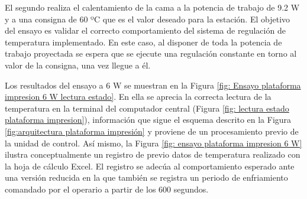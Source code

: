 El segundo realiza el calentamiento de la cama a la potencia de trabajo de 9.2 W y a una consigna de 60 ºC que es el valor deseado para la estación. El objetivo del ensayo es validar el correcto comportamiento del sistema de regulación de temperatura implementado. En este caso, al disponer de toda la potencia de trabajo proyectada se espera que se ejecute una regulación constante en torno al valor de la consigna, una vez llegue a él.

Los resultados del ensayo a 6 W se muestran en la Figura \ref{fig: Ensayo plataforma impresion 6 W lectura estado}. En ella se aprecia la correcta lectura de la temperatura en la terminal del computador central (Figura \ref{fig: lectura estado plataforma impresion}), información que sigue el esquema descrito en la Figura \ref{fig:arquitectura plataforma impresión} y proviene de un procesamiento previo de la unidad de control. Así mismo, la Figura \ref{fig: ensayo plataforma impresion 6 W} ilustra conceptualmente un registro de previo datos de temperatura realizado con la hoja de cálculo Excel. El registro se adecúa al comportamiento esperado ante una versión reducida en la que también se registra un periodo de enfriamiento comandado por el operario a partir de los 600 segundos.

